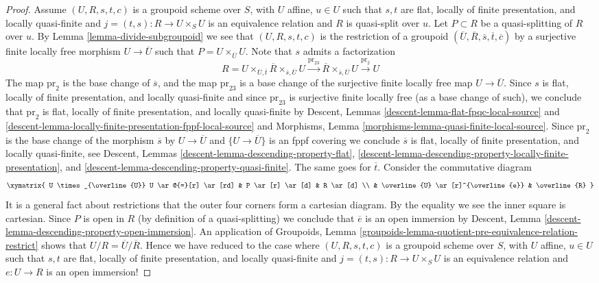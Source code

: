 \begin{proof}
\medskip\noindent
Assume $(U, R, s, t, c)$ is a groupoid scheme over $S$,
with $U$ affine, $u \in U$ such that $s, t$ are flat, locally
of finite presentation, and locally quasi-finite and
$j = (t, s) : R \to U \times_S U$ is an equivalence relation
and $R$ is quasi-split over $u$. Let $P \subset R$ be a quasi-splitting
of $R$ over $u$. By
Lemma \ref{lemma-divide-subgroupoid}
we see that $(U, R, s, t, c)$ is the restriction of a groupoid
$(\overline{U}, \overline{R}, \overline{s}, \overline{t}, \overline{c})$
by a surjective finite locally free morphism $U \to \overline{U}$ such that
$P = U \times_{\overline{U}} U$. Note that $s$ admits a factorization
$$
R = U \times_{\overline{U}, \overline{t}} \overline{R}
\times_{\overline{s}, \overline{U}} U
\xrightarrow{\text{pr}_{23}}
\overline{R} \times_{\overline{s}, \overline{U}} U
\xrightarrow{\text{pr}_2} U
$$
The map $\text{pr}_2$ is the base change of $\overline{s}$, and
the map $\text{pr}_{23}$ is a base change of the surjective finite locally
free map $U \to \overline{U}$. Since $s$ is flat, locally
of finite presentation, and locally quasi-finite and since $\text{pr}_{23}$
is surjective finite locally free (as a base change of such), we
conclude that $\text{pr}_2$ is flat, locally
of finite presentation, and locally quasi-finite by
Descent, Lemmas
\ref{descent-lemma-flat-fpqc-local-source} and
\ref{descent-lemma-locally-finite-presentation-fppf-local-source} and
Morphisms, Lemma \ref{morphisms-lemma-quasi-finite-local-source}.
Since $\text{pr}_2$ is the base change of the morphism
$\overline{s}$ by $U \to \overline{U}$ and $\{U \to \overline{U}\}$
is an fppf covering we conclude $\overline{s}$ is
flat, locally of finite presentation, and locally quasi-finite, see
Descent, Lemmas \ref{descent-lemma-descending-property-flat},
\ref{descent-lemma-descending-property-locally-finite-presentation}, and
\ref{descent-lemma-descending-property-quasi-finite}. The same goes
for $\overline{t}$. Consider the commutative diagram
$$
\xymatrix{
U \times_{\overline{U}} U \ar@{=}[r] \ar[rd] & P \ar[r] \ar[d] & R \ar[d] \\
& \overline{U} \ar[r]^{\overline{e}} & \overline{R}
}
$$
It is a general fact about restrictions that the outer four corners
form a cartesian diagram. By the equality we see the inner square is
cartesian. Since $P$ is open in $R$ (by definition of a quasi-splitting)
we conclude that $\overline{e}$ is an open immersion by
Descent, Lemma \ref{descent-lemma-descending-property-open-immersion}.
An application of
Groupoids,
Lemma \ref{groupoids-lemma-quotient-pre-equivalence-relation-restrict}
shows that $U/R = \overline{U}/\overline{R}$. Hence we have reduced to
the case where $(U, R, s, t, c)$ is a groupoid scheme over $S$,
with $U$ affine, $u \in U$ such that $s, t$ are flat, locally
of finite presentation, and locally quasi-finite and
$j = (t, s) : R \to U \times_S U$ is an equivalence relation
and $e : U \to R$ is an open immersion!


\end{proof}
